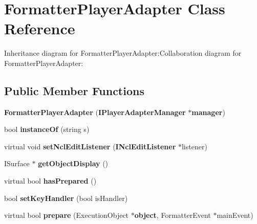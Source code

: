 \section{FormatterPlayerAdapter Class Reference}
\label{classbr_1_1pucrio_1_1telemidia_1_1ginga_1_1ncl_1_1adapters_1_1FormatterPlayerAdapter}
Inheritance diagram for FormatterPlayerAdapter:Collaboration diagram for FormatterPlayerAdapter:\subsection*{Public Member Functions}
\begin{CompactItemize}
\item 
\textbf{FormatterPlayerAdapter} ({\bf IPlayerAdapterManager} $\ast${\bf manager})\label{classbr_1_1pucrio_1_1telemidia_1_1ginga_1_1ncl_1_1adapters_1_1FormatterPlayerAdapter_70150ce04a7aa639941c7155e322ce32}

\item 
bool \textbf{instanceOf} (string s)\label{classbr_1_1pucrio_1_1telemidia_1_1ginga_1_1ncl_1_1adapters_1_1FormatterPlayerAdapter_4081cb1ebb5adebc1d0858ff6f69af0d}

\item 
virtual void {\bf setNclEditListener} ({\bf INclEditListener} $\ast$listener)\label{classbr_1_1pucrio_1_1telemidia_1_1ginga_1_1ncl_1_1adapters_1_1FormatterPlayerAdapter_f2ebd5ca8e765095dbcc244fc11fb31d}

\item 
ISurface $\ast$ \textbf{getObjectDisplay} ()\label{classbr_1_1pucrio_1_1telemidia_1_1ginga_1_1ncl_1_1adapters_1_1FormatterPlayerAdapter_1f2e03156a3c2547a31d2bbd1cef37a7}

\item 
virtual bool \textbf{hasPrepared} ()\label{classbr_1_1pucrio_1_1telemidia_1_1ginga_1_1ncl_1_1adapters_1_1FormatterPlayerAdapter_54fc8af2d22bee49a7858c6e0df829db}

\item 
bool \textbf{setKeyHandler} (bool isHandler)\label{classbr_1_1pucrio_1_1telemidia_1_1ginga_1_1ncl_1_1adapters_1_1FormatterPlayerAdapter_0e3bb20e5956653c0c0b112fb3b66a54}

\item 
virtual bool \textbf{prepare} (ExecutionObject $\ast${\bf object}, FormatterEvent $\ast$mainEvent)\label{classbr_1_1pucrio_1_1telemidia_1_1ginga_1_1ncl_1_1adapters_1_1FormatterPlayerAdapter_96d0bce73b715f0a6fe5dedf903a5529}


\end{CompactItemize}
